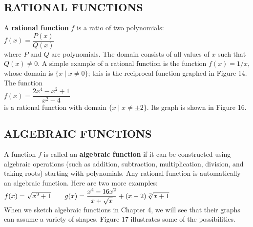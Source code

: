 \documentclass{sebase}
\begin{document}
\subsection{RATIONAL FUNCTIONS\protect\vspace{-6pt}}

A \textbf{rational function} $f$ is a ratio of two
polynomials:\\[6pt]
\hspace*{\fill}$f(x)=\dfrac{P(x)}{Q(x)}$\hspace*{\fill}\\[6pt]
where $P$ and $Q$ are polynomials. The domain consists of all values of $x$
such that $Q(x)\neq 0$. A simple example of a rational function is the
function $f(x)=1/x$, whose domain is $\{x\mid x\neq 0\}$; this is the
reciprocal function graphed in Figure 14. The function\\[6pt]
\hspace*{\fill}$f(x)=\dfrac{2x^{4}-x^{2}+1}{x^{2}-4}$\hspace*{\fill}\\[8pt]
is a rational function with domain $\{x\mid x\neq \pm 2\}$. Its graph is
shown in Figure 16.\vspace*{9pt}

\subsection{ALGEBRAIC FUNCTIONS\protect\vspace{-6pt}}

A function $f$ is called an \textbf{algebraic function} if it can be
constructed using algebraic operations (such as addition, subtraction,
multiplication, division, and taking roots) starting with polynomials. Any
rational function is automatically an algebraic function. Here are two more
examples:\\[6pt]
\hspace*{\fill}$f(x)=\sqrt{x^{2}+1}\qquad g(x)=\dfrac{x^{4}-16x^{2}}{x+\sqrt{%
x}}+(x-2)\,\sqrt[3]{x+1}$\hspace*{\fill}\\[6pt]
When we sketch algebraic functions in Chapter 4, we will see that their
graphs can assume a variety of shapes. Figure 17 illustrates some of the
possibilities.\vspace*{6pt}
\end{document}
